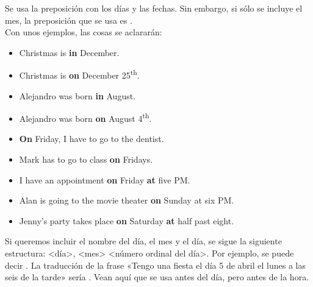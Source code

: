 Se usa la preposici\'on \textbf{} con los d\'ias y las fechas.
Sin embargo, si s\'olo se incluye el mes, la preposici\'on que se usa es \textbf{}. \\

Con unos ejemplos, las cosas se aclarar\'an:
\begin{itemize}
	\item {}
		\arr Christmas is \textbf{in} December.
	\item {}
		\arr Christmas is \textbf{on} December 25\textsuperscript{th}.
	\item {}
		\arr Alejandro was born \textbf{in} August.
	\item {}
		\arr Alejandro was born \textbf{on} August 4\textsuperscript{th}.
	\item {}
		\arr \textbf{On} Friday, I have to go to the dentist.
	\item {}
		\arr Mark has to go to class \textbf{on} Fridays.
	\item {}
		\arr I have an appointment \textbf{on} Friday \textbf{at} five PM.
	\item {}
		\arr Alan is going to the movie theater \textbf{on} Sunday at six PM.
	\item {}
		\arr Jenny's party takes place \textbf{on} Saturday \textbf{at} half past eight.
\end{itemize}


Si queremos incluir el nombre del d\'ia, el mes y el d\'ia, se sigue la siguiente estructura:
<día>, <mes> <número ordinal del d\'ia>.
Por ejemplo, se puede decir .
La traducci\'on de la frase «Tengo una fiesta el d\'ia 5 de abril el lunes a las seis de la tarde» ser\'ia
.
Vean aqu\'i que se usa  antes del d\'ia, pero  antes de la hora. \\

